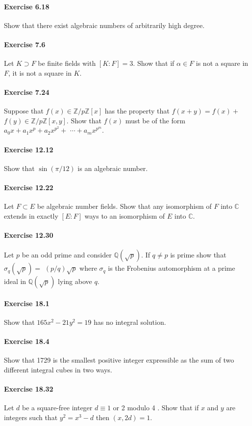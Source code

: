 \documentclass{article}
\begin{document}
\paragraph{Exercise 6.18} Show that there exist algebraic numbers of arbitrarily high degree.

\paragraph{Exercise 7.6} Let $K \supset F$ be finite fields with $[K: F]=3$. Show that if $\alpha \in F$ is not a square in $F$, it is not a square in $K$.

\paragraph{Exercise 7.24} Suppose that $f(x) \in \mathbb{Z} / p \mathbb{Z}[x]$ has the property that $f(x+y)=f(x)+$ $f(y) \in \mathbb{Z} / p \mathbb{Z}[x, y]$. Show that $f(x)$ must be of the form $a_{0} x+a_{1} x^{p}+a_{2} x^{p^{2}}+$ $\cdots+a_{m} x^{p^{m}}$.

\paragraph{Exercise 12.12} Show that $\sin (\pi / 12)$ is an algebraic number.


\paragraph{Exercise 12.22} Let $F \subset E$ be algebraic number fields. Show that any isomorphism of $F$ into $\mathbb{C}$ extends in exactly $[E: F]$ ways to an isomorphism of $E$ into $\mathbb{C}$.

\paragraph{Exercise 12.30} Let $p$ be an odd prime and consider $\mathbb{Q}(\sqrt{p})$. If $q \neq p$ is prime show that $\sigma_{q}(\sqrt{p})=$ $(p / q) \sqrt{p}$ where $\sigma_{q}$ is the Frobenius automorphism at a prime ideal in $\mathbb{Q}(\sqrt{p})$ lying above $q$.

\paragraph{Exercise 18.1} Show that $165 x^{2}-21 y^{2}=19$ has no integral solution.

\paragraph{Exercise 18.4} Show that 1729 is the smallest positive integer expressible as the sum of two different integral cubes in two ways.

\paragraph{Exercise 18.32} Let $d$ be a square-free integer $d \equiv 1$ or 2 modulo 4 . Show that if $x$ and $y$ are integers such that $y^{2}=x^{3}-d$ then $(x, 2 d)=1$.
\end{document}
